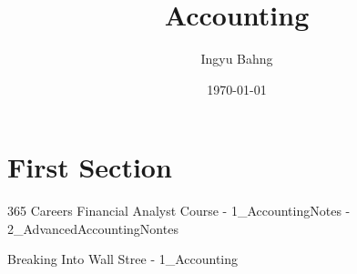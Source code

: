 \documentclass[10pt]{article}
\title{Accounting}
\date{\today}
\author{Ingyu Bahng}
\begin{document}


\section{First Section}

365 Careers Financial Analyst Course
- 1_AccountingNotes
- 2_AdvancedAccountingNontes

Breaking Into Wall Stree
- 1_Accounting
\end{document}
